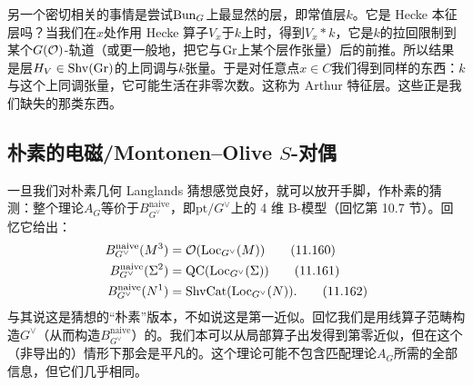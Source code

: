 另一个密切相关的事情是尝试$\mathrm{Bun}_G$上最显然的层，即常值层$k$。它是 Hecke 本征层吗？当我们在$x$处作用 Hecke 算子$V_x$于$k$上时，得到$V_x*k$，它是$k$的拉回限制到某个$G(\mathcal{O})$-轨道（或更一般地，把它与$\mathrm{Gr}$上某个层作张量）后的前推。所以结果是层$H_V\in\mathrm{Shv}(\mathrm{Gr})$的上同调与$k$张量。于是对任意点$x\in C$我们得到同样的东西：$k$与这个上同调张量，它可能生活在非零次数。这称为 Arthur 特征层。这些正是我们缺失的那类东西。

\subsection{朴素的电磁/Montonen–Olive $S$-对偶}\label{sec:11-8-1}

一旦我们对朴素几何 Langlands 猜想感觉良好，就可以放开手脚，作朴素的猜测：整个理论$A_G$等价于$B^{\mathrm{naive}}_{G^{\vee}}$，即$\mathrm{pt}/G^{\vee}$上的 4 维 B-模型（回忆第 10.7 节）。回忆它给出：
\begin{align}
B^{\mathrm{naive}}_{G^{\vee}}(M^{3})&=\mathcal{O}(\mathrm{Loc}_{G^{\vee}}(M))\tag{11.160}\\
B^{\mathrm{naive}}_{G^{\vee}}(\Sigma^{2})&=\mathrm{QC}(\mathrm{Loc}_{G^{\vee}}(\Sigma))\tag{11.161}\\
B^{\mathrm{naive}}_{G^{\vee}}(N^{1})&=\mathrm{Shv}\mathrm{Cat}(\mathrm{Loc}_{G^{\vee}}(N)).\tag{11.162}
\end{align}
与其说这是猜想的“朴素”版本，不如说这是第一近似。回忆我们是用线算子范畴构造$G^{\vee}$（从而构造$B^{\mathrm{naive}}_{G^{\vee}}$）的。我们本可以从局部算子出发得到第零近似，但在这个（非导出的）情形下那会是平凡的。这个理论可能不包含匹配理论$A_G$所需的全部信息，但它们几乎相同。

